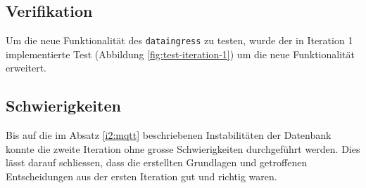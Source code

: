 \subsection{Verifikation}

Um die neue Funktionalität des \texttt{dataingress} zu testen, wurde der in Iteration 1
implementierte Test (Abbildung \ref{fig:test-iteration-1}) um die neue Funktionalität
erweitert.

\subsection{Schwierigkeiten}
Bis auf die im Absatz \ref{i2:mqtt} beschriebenen Instabilitäten der Datenbank konnte
die zweite Iteration ohne grosse Schwierigkeiten durchgeführt werden.
Dies lässt darauf schliessen, dass die erstellten Grundlagen und getroffenen Entscheidungen aus
der ersten Iteration gut und richtig waren.
